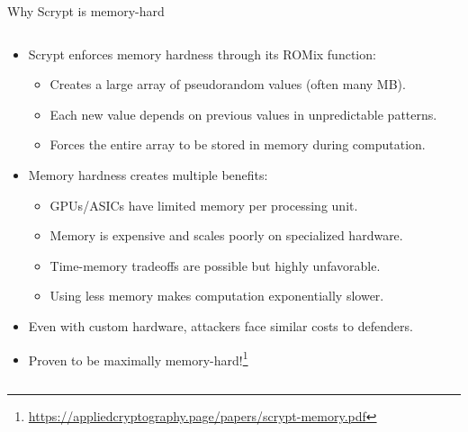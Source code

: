 \documentclass[aspectratio=169, lualatex, handout]{beamer}
\begin{document}
\begin{frame}{Why Scrypt is memory-hard}
	\begin{columns}[c]
		\begin{column}{1\textwidth}
			\begin{itemize}[<+->]
				\item Scrypt enforces memory hardness through its ROMix function:
				      \begin{itemize}
					      \item Creates a large array of pseudorandom values (often many MB).
					      \item Each new value depends on previous values in unpredictable patterns.
					      \item Forces the entire array to be stored in memory during computation.
				      \end{itemize}
				\item Memory hardness creates multiple benefits:
				      \begin{itemize}
					      \item GPUs/ASICs have limited memory per processing unit.
					      \item Memory is expensive and scales poorly on specialized hardware.
					      \item Time-memory tradeoffs are possible but highly unfavorable.
					      \item Using less memory makes computation exponentially slower.
				      \end{itemize}
				\item Even with custom hardware, attackers face similar costs to defenders.
				\item Proven to be maximally memory-hard!\footnote{\url{https://appliedcryptography.page/papers/scrypt-memory.pdf}}
			\end{itemize}
		\end{column}
	\end{columns}
\end{frame}
\end{document}
